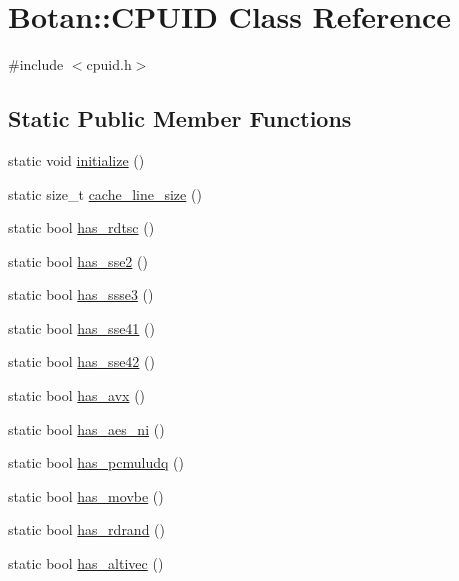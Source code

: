 \hypertarget{classBotan_1_1CPUID}{\section{Botan\-:\-:C\-P\-U\-I\-D Class Reference}
\label{classBotan_1_1CPUID}
}


{\ttfamily \#include $<$cpuid.\-h$>$}

\subsection*{Static Public Member Functions}
\begin{DoxyCompactItemize}
\item 
static void \hyperlink{classBotan_1_1CPUID_a9d838e9ecef2b418e6ea2ffe04b88c01}{initialize} ()
\item 
static size\-\_\-t \hyperlink{classBotan_1_1CPUID_a548d3457df147bd0592ce61ccdaf1489}{cache\-\_\-line\-\_\-size} ()
\item 
static bool \hyperlink{classBotan_1_1CPUID_a80e01f2962db068c419be47a2b69f541}{has\-\_\-rdtsc} ()
\item 
static bool \hyperlink{classBotan_1_1CPUID_a2f91d0263e06fdf1d9d53cbc4d2a7319}{has\-\_\-sse2} ()
\item 
static bool \hyperlink{classBotan_1_1CPUID_a26e9fe7f4e5b1fb719e4f3c433567f68}{has\-\_\-ssse3} ()
\item 
static bool \hyperlink{classBotan_1_1CPUID_adfddf71493d6a30e0df3333fa300a091}{has\-\_\-sse41} ()
\item 
static bool \hyperlink{classBotan_1_1CPUID_a30c51e5c9ce71c16d8ef1a3ea3642f99}{has\-\_\-sse42} ()
\item 
static bool \hyperlink{classBotan_1_1CPUID_a304389b3006bb6a59fada319648d1c00}{has\-\_\-avx} ()
\item 
static bool \hyperlink{classBotan_1_1CPUID_a0200526faaa14043194754ad1a3ed064}{has\-\_\-aes\-\_\-ni} ()
\item 
static bool \hyperlink{classBotan_1_1CPUID_af2013faf42c8ca322bdd50c4f7622b55}{has\-\_\-pcmuludq} ()
\item 
static bool \hyperlink{classBotan_1_1CPUID_a9bab7a05739b0363e238c9fa0a2d3830}{has\-\_\-movbe} ()
\item 
static bool \hyperlink{classBotan_1_1CPUID_aac5d557b4cc6c7f5a14eb101dee0c63a}{has\-\_\-rdrand} ()
\item 
static bool \hyperlink{classBotan_1_1CPUID_af3faa6c3fa3bfce6ab54e9772e2df00d}{has\-\_\-altivec} ()
\end{DoxyCompactItemize}


